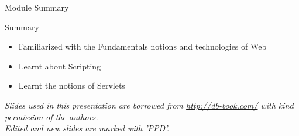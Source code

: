 \documentclass[aspectratio=169, xcolor=dvipsnames]{beamer}
\begin{document}
\begin{frame}{Module Summary}
    \begin{block}{Summary}
        \begin{itemize}[<+->]
            \item Familiarized with the Fundamentals notions and technologies of Web
            \item Learnt about Scripting
            \item Learnt the notions of Servlets
        \end{itemize}
    \end{block}
    \vspace{2em}
    \begin{center}
    \small \textit{Slides used in this presentation are borrowed from \url{http://db-book.com/} with kind permission of the authors.} \\
    \small \textit{Edited and new slides are marked with 'PPD'.}
    \end{center}
\end{frame}
\end{document}
